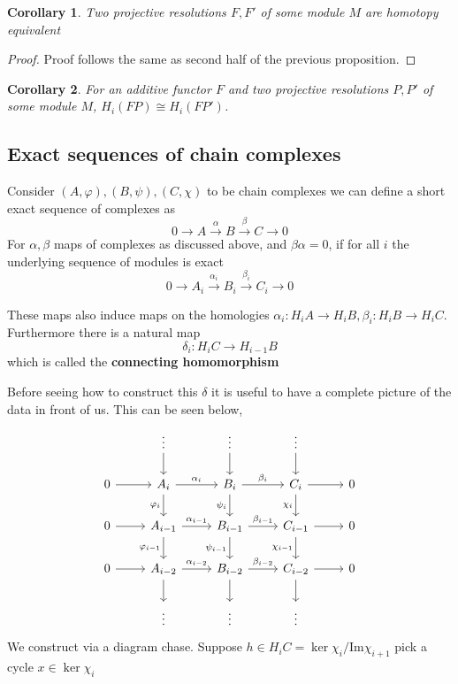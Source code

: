 \documentclass[12pt]{article}
\numberwithin{equation}{section}
\newcommand{\image}{{\mathrm{Im}}}
\newtheorem{corollary}{Corollary}[theorem]
\begin{document}
	\begin{corollary}
		Two projective resolutions $F, F'$ of some module $M$ are homotopy equivalent 
	\end{corollary}
	\begin{proof}
		Proof follows the same as second half of the previous proposition.
	\end{proof}
	\begin{corollary}
		For an additive functor $F$ and two projective resolutions $P, P'$ of some module $M$, $H_i(FP) \cong H_i(FP')$.
	\end{corollary}
	
	\subsection{Exact sequences of chain complexes}
	Consider $(A,\varphi),(B,\psi),(C,\chi)$ to be chain complexes we can define a short exact sequence of complexes as \[ 0 \to A \xrightarrow{\alpha} B \xrightarrow{\beta} C \to 0 \]
	For $\alpha, \beta $ maps of complexes as discussed above, and $\beta \alpha=0$, if for all $i$ the underlying sequence of modules is exact\[ 0 \to A_i \xrightarrow{\alpha_i } B_i \xrightarrow{\beta_i } C_i \to 0\]
	
	These maps also induce maps on the homologies $\alpha_i: H_i A \to H_i B, \beta_i: H_i B \to H_i C$. Furthermore there is a natural map \[ 	\delta_i : H_i C \to H_{i-1}B \] which is called the \textbf{connecting homomorphism}
	
	Before seeing how to construct this $\delta $ it is useful to have a complete picture of the data in front of us. This can be seen below,
	\[\begin{tikzcd}
		& \vdots & \vdots & \vdots \\
		0 & {A_i} & {B_i} & {C_i} & 0 \\
		0 & {A_{i-1}} & {B_{i-1}} & {C_{i-1}} & 0 \\
		0 & {A_{i-2}} & {B_{i-2}} & {C_{i-2}} & 0 \\
		& \vdots & \vdots & \vdots
		\arrow[from=2-1, to=2-2]
		\arrow["{\alpha_i}", from=2-2, to=2-3]
		\arrow["{\beta_i}", from=2-3, to=2-4]
		\arrow[from=2-4, to=2-5]
		\arrow[from=3-1, to=3-2]
		\arrow[from=4-1, to=4-2]
		\arrow["{\alpha_{i-1}}", from=3-2, to=3-3]
		\arrow["{\beta_{i-1}}", from=3-3, to=3-4]
		\arrow[from=3-4, to=3-5]
		\arrow["{\alpha_{i-2}}", from=4-2, to=4-3]
		\arrow["{\beta_{i-2}}", from=4-3, to=4-4]
		\arrow[from=4-4, to=4-5]
		\arrow["{\varphi_i}"', from=2-2, to=3-2]
		\arrow["{\varphi_{i-1}}"', from=3-2, to=4-2]
		\arrow[from=4-2, to=5-2]
		\arrow[from=1-2, to=2-2]
		\arrow[from=1-3, to=2-3]
		\arrow[from=1-4, to=2-4]
		\arrow["{\psi_i}"', from=2-3, to=3-3]
		\arrow["{\chi_i}"', from=2-4, to=3-4]
		\arrow["{\psi_{i-1}}"', from=3-3, to=4-3]
		\arrow["{\chi_{i-1}}"', from=3-4, to=4-4]
		\arrow[from=4-3, to=5-3]
		\arrow[from=4-4, to=5-4]
	\end{tikzcd}\]
	We construct via a diagram chase. Suppose $h \in H_i C= \ker \chi_i / \image \chi_{i+1} $ pick a cycle $x\in \ker \chi_i$
	
\end{document}
